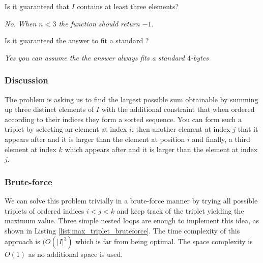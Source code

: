 \begin{QandA}
	\item \begin{questionitem} \begin{question} Is it guaranteed that $I$ contains at least three elements?  \end{question} 	 
    \begin{answered}
		\textit{No. When $n < 3$ the function should return $-1$.}
	\end{answered} \end{questionitem}
	\item \begin{questionitem} \begin{question} Is it guaranteed the answer to fit a standard ?  \end{question} 	 
    \begin{answered}
		\textit{Yes you can assume the the answer always fits a standard $4$-bytes }
	\end{answered} \end{questionitem}
\end{QandA}

\subsubsection{Discussion}
\label{max_triplet:sec:discussion}
The problem is asking us to find the largest possible sum obtainable by summing up three distinct
elements of $I$ with the additional constraint that when ordered according to their indices they
form a sorted sequence. You can form such a triplet by selecting an element at index $i$, then
another element at index $j$ that it appears after and it is larger than the element at position $i$
and finally, a third element at index $k$ which appears after and it is larger than the element at
index $j$.

\subsubsection{Brute-force}
\label{max_triplet:sec:bruteforce}
We can solve this problem trivially in a brute-force manner by trying all possible triplets of
ordered indices $i < j <k$ and keep track of the triplet yielding the maximum value. Three simple
nested loops are enough to implement this idea, as shown in Listing
\ref{list:max_triplet_bruteforce}. The time complexity of this approach is $(O(|I|^3)$ which is far
from being optimal. The space complexity is $O(1)$ as no additional space is used.


